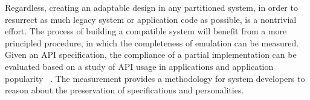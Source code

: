 

Regardless, creating an adaptable design
in any partitioned system,
in order to resurrect as much legacy system or application code as possible,
is a nontrivial effort.
The process of building a compatible system will benefit from a more principled procedure,
in which the completeness of emulation can be measured.
Given an API specification,
the compliance of a partial implementation can be evaluated
based on a study of API usage in applications and application popularity
~\citep{tsai16apistudy}.
The measurement provides a methodology
for system developers to reason about the
preservation of specifications and personalities.




